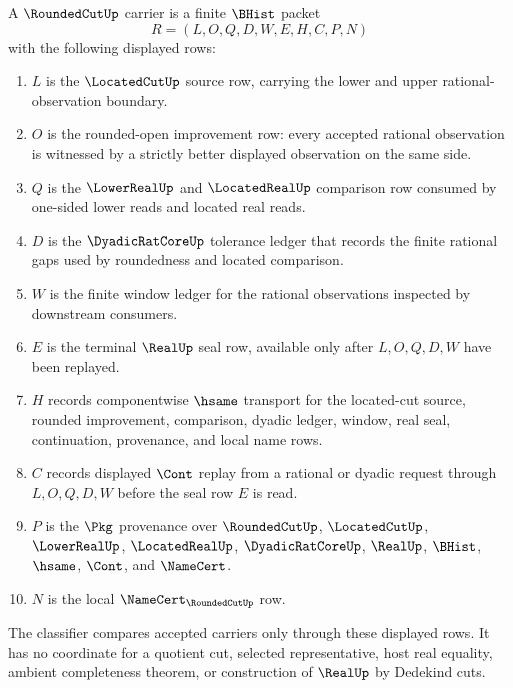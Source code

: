 \begin{definition}
\label{def:rounded-cut-carrier}
A $\RoundedCutUp$ carrier is a finite $\BHist$ packet
$$
R=(L,O,Q,D,W,E,H,C,P,N)
$$
with the following displayed rows:
\begin{enumerate}
\item $L$ is the $\LocatedCutUp$ source row, carrying the lower and upper rational-observation boundary.
\item $O$ is the rounded-open improvement row: every accepted rational observation is witnessed by a strictly better displayed observation on the same side.
\item $Q$ is the $\LowerRealUp$ and $\LocatedRealUp$ comparison row consumed by one-sided lower reads and located real reads.
\item $D$ is the $\DyadicRatCoreUp$ tolerance ledger that records the finite rational gaps used by roundedness and located comparison.
\item $W$ is the finite window ledger for the rational observations inspected by downstream consumers.
\item $E$ is the terminal $\RealUp$ seal row, available only after $L,O,Q,D,W$ have been replayed.
\item $H$ records componentwise $\hsame$ transport for the located-cut source, rounded improvement, comparison, dyadic ledger, window, real seal, continuation, provenance, and local name rows.
\item $C$ records displayed $\Cont$ replay from a rational or dyadic request through $L,O,Q,D,W$ before the seal row $E$ is read.
\item $P$ is the $\Pkg$ provenance over $\RoundedCutUp$, $\LocatedCutUp$, $\LowerRealUp$, $\LocatedRealUp$, $\DyadicRatCoreUp$, $\RealUp$, $\BHist$, $\hsame$, $\Cont$, and $\NameCert$.
\item $N$ is the local $\NameCert_{\RoundedCutUp}$ row.
\end{enumerate}
The classifier compares accepted carriers only through these displayed rows. It has no coordinate for a quotient cut, selected representative, host real equality, ambient completeness theorem, or construction of $\RealUp$ by Dedekind cuts.
\end{definition}

